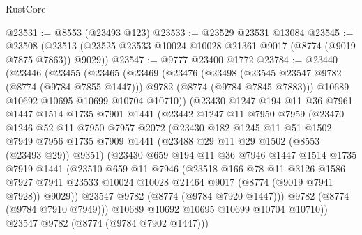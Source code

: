 \begin{lexlean}{RustCore}
\begin{coremodule}
@23531 := @8553 (@23493 @123)
@23533 := @23529 @23531 @13084
@23545 := @23508
    (@23513 (@23525 @23533 @10024 @10028 @21361 @9017 (@8774 (@9019 @7875 @7863)) @9029))
@23547 := @9777 @23400 @1772
@23784 := @23440
    (@23446
      (@23455
        (@23465
          (@23469
            (@23476
              (@23498
                (@23545 @23547 @9782 (@8774 (@9784 @7855 @1447)))
                @9782
                (@8774 (@9784 @7845 @7883)))
              @10689
              @10692
              @10695
              @10699
              @10704
              @10710))
          (@23430
            @1247
            @194
            @11
            @36
            @7961
            @1447
            @1514
            @1735
            @7901
            @1441
            (@23442
              @1247
              @11
              @7950
              @7959
              (@23470
                @1246
                @52
                @11
                @7950
                @7957
                @2072
                (@23430
                  @182
                  @1245
                  @11
                  @51
                  @1502
                  @7949
                  @7956
                  @1735
                  @7909
                  @1441
                  (@23488 @29 @11 @29 @1502 (@8553 (@23493 @29)) @9351)
                  (@23430
                    @659
                    @194
                    @11
                    @36
                    @7946
                    @1447
                    @1514
                    @1735
                    @7919
                    @1441
                    (@23510
                      @659
                      @11
                      @7946
                      (@23518
                        @166
                        @78
                        @11
                        @3126
                        @1586
                        @7927
                        @7941
                        @23533
                        @10024
                        @10028
                        @21464
                        @9017
                        (@8774 (@9019 @7941 @7928))
                        @9029))
                    @23547
                    @9782
                    (@8774 (@9784 @7920 @1447)))
                  @9782
                  (@8774 (@9784 @7910 @7949)))
                @10689
                @10692
                @10695
                @10699
                @10704
                @10710))
            @23547
            @9782
            (@8774 (@9784 @7902 @1447)))

\end{coremodule}
\end{lexlean}
